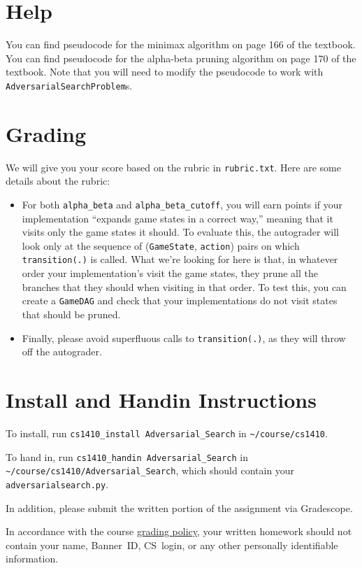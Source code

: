 \documentclass{article}
\begin{document}
\section{Help}
You can find pseudocode for the minimax algorithm on page 166 of the textbook.
You can find pseudocode for the alpha-beta pruning algorithm on page 170 of the textbook.
Note that you will need to modify the pseudocode to work with \verb|AdversarialSearchProblem|s.


\section{Grading}
We will give you your score based on the rubric in \verb|rubric.txt|.
Here are some details about the rubric:

\begin{itemize}
  \item For both \verb|alpha_beta| and \verb|alpha_beta_cutoff|, you will earn points if your implementation ``expands game states in a correct way,'' meaning that it visits only the game states it should.
  To evaluate this, the autograder will look only at the sequence of (\verb|GameState|, \verb|action|) pairs on which \verb|transition(.)| is called.
  What we're looking for here is that, in whatever order your implementation's visit the game states, they prune all the branches that they should when visiting in that order.
  To test this, you can create a \verb|GameDAG| and check that your implementations do not visit states that should be pruned.

  \item Finally, please avoid superfluous calls to \verb|transition(.)|, as they will throw off the autograder.
\end{itemize}


\section{Install and Handin Instructions}
To install, run \verb|cs1410_install Adversarial_Search| in \verb|~/course/cs1410|.

To hand in, run \verb|cs1410_handin Adversarial_Search| in
\verb|~/course/cs1410/Adversarial_Search|,
which should contain your \verb|adversarialsearch.py|.

In addition, please submit the written portion of the assignment via Gradescope.

In accordance with the course \href{https://forms.gle/DqfbBY8jdaqenRoa9}{grading policy}, your
written homework should not contain your name, Banner~ID, CS~login, or any other personally
identifiable information.
\end{document}
